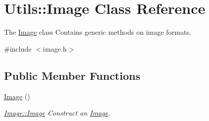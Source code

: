\hypertarget{classUtils_1_1Image}{\section{Utils\-:\-:Image Class Reference}
\label{classUtils_1_1Image}
}


The \hyperlink{classUtils_1_1Image}{Image} class Contains generic methods on image formats.  




{\ttfamily \#include $<$image.\-h$>$}

\subsection*{Public Member Functions}
\begin{DoxyCompactItemize}
\item 
\hypertarget{classUtils_1_1Image_a9ce15d09b2071343d714c17aa31aa587}{\hyperlink{classUtils_1_1Image_a9ce15d09b2071343d714c17aa31aa587}{Image} ()}\label{classUtils_1_1Image_a9ce15d09b2071343d714c17aa31aa587}

\begin{DoxyCompactList}\small\item\em \hyperlink{classUtils_1_1Image_a9ce15d09b2071343d714c17aa31aa587}{Image\-::\-Image} Construct an \hyperlink{classUtils_1_1Image}{Image}. \end{DoxyCompactList}\end{DoxyCompactItemize}
